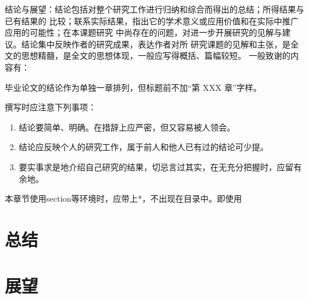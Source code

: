 结论与展望：结论包括对整个研究工作进行归纳和综合而得出的总结；所得结果与已有结果的
比较；联系实际结果，指出它的学术意义或应用价值和在实际中推广应用的可能性；在本课题研究
中尚存在的问题，对进一步开展研究的见解与建议。结论集中反映作者的研究成果，表达作者对所
研究课题的见解和主张，是全文的思想精髓，是全文的思想体现，一般应写得概括、篇幅较短。
一般致谢的内容有：

毕业论文的结论作为单独一章排列，但标题前不加“第 XXX 章”字样。

撰写时应注意下列事项：

\begin{enumerate}[label=(\chinese*),itemindent=2em]

    \item 结论要简单、明确。在措辞上应严密，但又容易被人领会。
    \item 结论应反映个人的研究工作，属于前人和他人已有过的结论可少提。
    \item 要实事求是地介绍自己研究的结果，切忌言过其实，在无充分把握时，应留有余地。

\end{enumerate}

本章节使用section等环境时，应带上*，不出现在目录中。即使用\clist{\section*{}}
\section*{总结}
\section*{展望}

\newpage
\indent
\newpage

